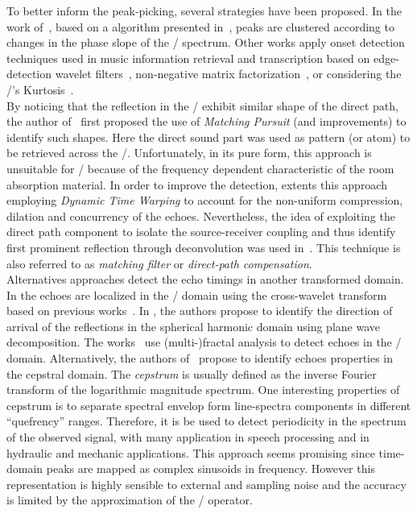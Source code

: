 To better inform the peak-picking, several strategies have been proposed.
In the work of~, based on a algorithm presented in~, peaks are clustered according to changes in the phase slope of the \RIR/ spectrum.
Other works apply onset detection techniques used in music information retrieval and transcription based on edge-detection wavelet filters~, non-negative matrix factorization~, or considering the \RIR/'s Kurtosis~.
\\By noticing that the reflection in the \RIRs/ exhibit similar shape of the direct path, the author of~ first proposed the use of \textit{Matching Pursuit} (and improvements) to identify such shapes.
Here the direct sound part was used as pattern (or atom) to be retrieved across the \RIR/.
Unfortunately, in its pure form, this approach is unsuitable for \RIRs/ because of the frequency dependent characteristic of the room absorption material.
In order to improve the detection,  extents this approach employing \textit{Dynamic Time Warping} to account for the non-uniform compression, dilation and concurrency of the echoes.
Nevertheless, the idea of exploiting the direct path component to isolate the source-receiver coupling and thus identify first prominent reflection through deconvolution was used in~.
This technique is also referred to as \textit{matching filter} or \textit{direct-path compensation}.
\\Alternatives approaches detect the echo timings in another transformed domain.
In  the echoes are localized in the \TFdef/ domain using the cross-wavelet transform based on previous works~.
In , the authors propose to identify the direction of arrival of the reflections in the spherical harmonic domain using plane wave decomposition.
The works~ use (multi-)fractal analysis to detect echoes in the \TFdef/ domain.
Alternatively, the authors of~ propose to identify echoes properties in the cepstral domain.
The \textit{cepstrum} is usually defined as the inverse Fourier transform of the logarithmic magnitude spectrum. One interesting properties of cepstrum is to separate spectral envelop form line-spectra components in different ``quefrency'' ranges.
Therefore, it is be used to detect periodicity in the spectrum of the observed signal, with many application in speech processing and in hydraulic and mechanic applications.
This approach seems promising since time-domain peaks are mapped as complex sinusoids in frequency.
However this representation is highly sensible to external and sampling noise and the accuracy is limited by the approximation of the \DFT/ operator.

